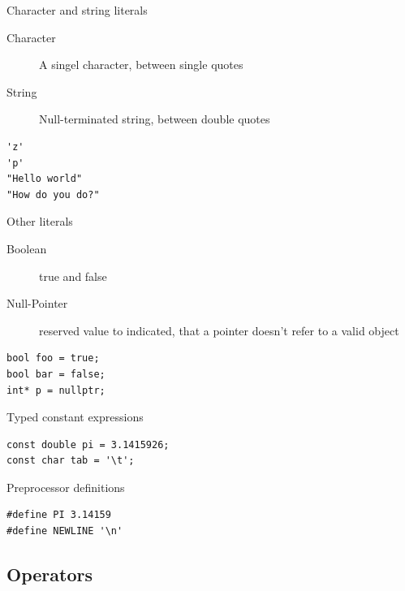 \documentclass{beamer}
\begin{document}
\begin{frame}[fragile]{Character and string literals}
\begin{description}
\item[Character] A singel character, between single quotes
\item[String] Null-terminated string, between double quotes 
\end{description}
\begin{lstlisting}[caption=Character and string literals]
'z'
'p'
"Hello world"
"How do you do?"
\end{lstlisting}

\end{frame}

\begin{frame}[fragile]{Other literals}
\begin{description}
\item[Boolean] true and false
\item[Null-Pointer] reserved value to indicated, that a pointer doesn't refer to
a valid object
\end{description}
\begin{lstlisting}[caption=Other literals]
bool foo = true;
bool bar = false;
int* p = nullptr;
\end{lstlisting}
\end{frame}

\begin{frame}[fragile]{Typed constant expressions}
\begin{lstlisting}[caption=Typed constant expressions]
const double pi = 3.1415926;
const char tab = '\t';
\end{lstlisting}
\end{frame}

\begin{frame}[fragile]{Preprocessor definitions}
\begin{lstlisting}[caption=Preprocessor definitions]
#define PI 3.14159
#define NEWLINE '\n'
\end{lstlisting}
\end{frame}


\subsection{Operators}
\end{document}
